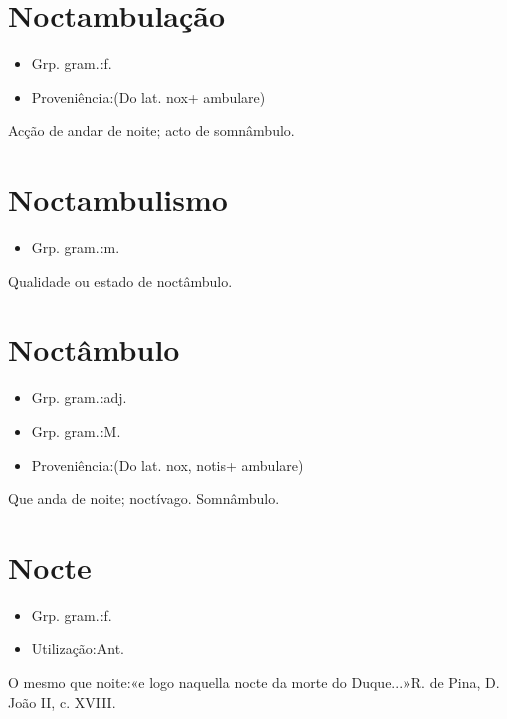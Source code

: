 \section{Noctambulação}
\begin{itemize}
\item {Grp. gram.:f.}
\end{itemize}
\begin{itemize}
\item {Proveniência:(Do lat. \textunderscore nox\textunderscore  + \textunderscore ambulare\textunderscore )}
\end{itemize}
Acção de andar de noite; acto de somnâmbulo.
\section{Noctambulismo}
\begin{itemize}
\item {Grp. gram.:m.}
\end{itemize}
Qualidade ou estado de noctâmbulo.
\section{Noctâmbulo}
\begin{itemize}
\item {Grp. gram.:adj.}
\end{itemize}
\begin{itemize}
\item {Grp. gram.:M.}
\end{itemize}
\begin{itemize}
\item {Proveniência:(Do lat. \textunderscore nox\textunderscore , \textunderscore notis\textunderscore  + \textunderscore ambulare\textunderscore )}
\end{itemize}
Que anda de noite; noctívago.
Somnâmbulo.
\section{Nocte}
\begin{itemize}
\item {Grp. gram.:f.}
\end{itemize}
\begin{itemize}
\item {Utilização:Ant.}
\end{itemize}
O mesmo que \textunderscore noite\textunderscore :«\textunderscore e logo naquella nocte da morte do Duque...\textunderscore »R. de Pina, \textunderscore D. João II\textunderscore , c. XVIII.
